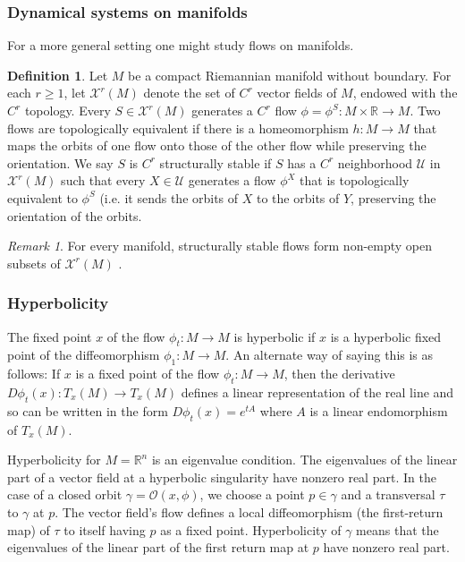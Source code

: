 \documentclass{article}
\theoremstyle{definition}
\newtheorem{definition}{Definition}
\theoremstyle{remark}
\newtheorem{remark}{Remark}
\newcommand{\reals}{\mathbb{R}}
\newcommand{\mcU}{\mathcal{U}}
\newcommand{\mcX}{\mathcal{X}}
\newcounter{ct}
\begin{document}
\subsubsection{Dynamical systems on manifolds}
For a more general setting one might study flows on manifolds.
\begin{definition}
Let $M$ be a compact Riemannian manifold without boundary. For each $r\geq 1$, let $\mcX^r(M)$ denote the set of $C^r$ vector fields of $M$, endowed with the $C^r$ topology. Every $S\in \mcX^r(M)$ generates a $C^r$ flow $\phi=\phi^S\colon M\times \reals\rightarrow M$.
Two flows are topologically equivalent if there is a homeomorphism $h\colon M\rightarrow M$ that maps the orbits of one flow onto those of the other flow while preserving the orientation. 
 We say $S$ is $C^r$ structurally stable if $S$ has a $C^r$ neighborhood $\mcU$ in $\mcX^r(M)$ such that every $X \in \mcU$ generates a flow $\phi^X$ that is topologically equivalent to $\phi^S$ (i.e. it sends the orbits of $X$ to the orbits of $Y$, preserving the orientation of the orbits.
\end{definition}

\begin{remark}
For every manifold, structurally stable flows form non-empty open subsets of $\mcX^r(M)$ \citep{palis1970ss}.
\end{remark}

\subsubsection{Hyperbolicity}
The fixed point $x$ of the flow $\phi_t\colon M\rightarrow M$ is hyperbolic if $x$ is a hyperbolic fixed point of the diffeomorphism $\phi_1: M\rightarrow M$.
 An alternate way of saying this is as follows: If $x$ is a fixed point of the flow $\phi_t\colon M\rightarrow M$, then the derivative $D\phi_t(x)\colon T_x(M)\rightarrow T_x(M)$ defines a linear representation of the real line and so can be written in the form $D\phi_t(x)=e^{tA}$ where $A$ is a linear endomorphism of $T_x(M)$.


Hyperbolicity for $M=\reals^n$ is an eigenvalue condition.
The eigenvalues of the linear part of a vector field at a hyperbolic singularity have nonzero real part.
In the case of a closed orbit $\gamma=\mathcal{O}(x,\phi)$, we choose a point $p\in\gamma$ and a transversal $\tau$ to $\gamma$ at $p$.
The vector field's flow defines a local diffeomorphism (the first-return map) of $\tau$ to itself having $p$ as a fixed point.
Hyperbolicity of $\gamma$ means that the eigenvalues of the linear part of the first return map at $p$ have nonzero real part.
   
\end{document}

